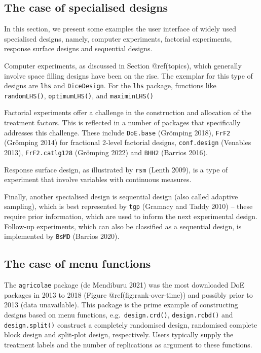 \documentclass{article}
\begin{document}
\hypertarget{the-case-of-specialised-designs}{%
\subsection{The case of specialised
designs}\label{the-case-of-specialised-designs}}

In this section, we present some examples the user interface of widely
used specialised designs, namely, computer experiments, factorial
experiments, response surface designs and sequential designs.

Computer experiments, as discussed in Section @ref(topics), which
generally involve space filling designs have been on the rise. The
exemplar for this type of designs are \texttt{lhs} and
\texttt{DiceDesign}. For the \texttt{lhs} package, functions like
\texttt{randomLHS()}, \texttt{optimumLHS()}, and \texttt{maximinLHS()}

Factorial experiments offer a challenge in the construction and
allocation of the treatment factors. This is reflected in a number of
packages that specifically addresses this challenge. These include
\texttt{DoE.base} (Grömping 2018), \texttt{FrF2} (Grömping 2014) for
fractional 2-level factorial designs, \texttt{conf.design} (Venables
2013), \texttt{FrF2.catlg128} (Grömping 2022) and \texttt{BHH2} (Barrios
2016).

Response surface design, as illustrated by \texttt{rsm} (Lenth 2009), is
a type of experiment that involve variables with continuous measures.

Finally, another specialised design is sequential design (also called
adaptive sampling), which is best represented by \texttt{tgp} (Gramacy
and Taddy 2010) -- these require prior information, which are used to
inform the next experimental design. Follow-up experiments, which can
also be classified as a sequential design, is implemented by
\texttt{BsMD} (Barrios 2020).

\hypertarget{the-case-of-menu-functions}{%
\subsection{The case of menu
functions}\label{the-case-of-menu-functions}}

The \texttt{agricolae} package (de Mendiburu 2021) was the most
downloaded DoE packages in 2013 to 2018 (Figure
@ref(fig:rank-over-time)) and possibly prior to 2013 (data unavailable).
This package is the prime example of constructing designs based on menu
functions, e.g.~\texttt{design.crd()}, \texttt{design.rcbd()} and
\texttt{design.split()} construct a completely randomised design,
randomised complete block design and split-plot design, respectively.
Users typically supply the treatment labels and the number of
replications as argument to these functions.
\end{document}
